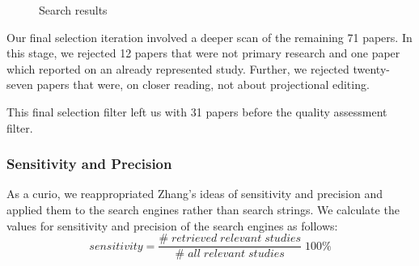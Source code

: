 \begin{figure}
    \centering
    \caption{Search results}
    \label{fig:search_results}
\end{figure}

Our final selection iteration involved a deeper scan of the remaining 71 papers.
In this stage, we rejected 12 papers that were not primary research and one paper which reported on an already represented study.
Further, we rejected twenty-seven papers that were, on closer reading, not about projectional editing.

This final selection filter left us with 31 papers before the quality assessment filter. 

\subsubsection{Sensitivity and Precision}
As a curio, we reappropriated Zhang's\cite{Zhang_2011} ideas of sensitivity and precision and applied them to the search engines rather than search strings.
We calculate the values for sensitivity and precision of the search engines as follows:
\[
        sensitivity = \frac{\#\;retrieved\;relevant\;studies}{\#\;all\;relevant\;studies} \;100\%
\]


